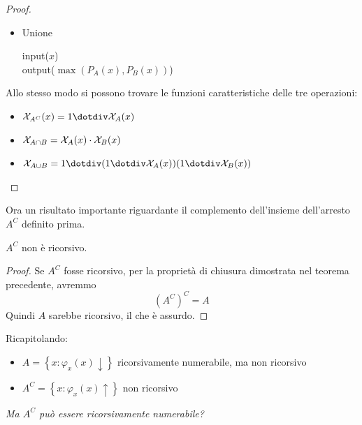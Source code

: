 \begin{proof}
\begin{itemize}
	\item Unione
	\begin{center}
		\begin{minipage}{.5\textwidth}
			\begin{tcolorbox}[
				colback=white,
				sharp corners,
				boxrule=.3mm,
				left=20pt,
				top=0pt,
				bottom=0pt,
				colbacktitle=white,
				coltitle=black
				]
				\begin{algorithm}[H]
					\SetAlgoNoEnd
					input($x$) \\
					output($\max (P_A (x), P_B (x))$)
				\end{algorithm}
			\end{tcolorbox}
		\end{minipage}
	\end{center}
	\end{itemize}

	Allo stesso modo si possono trovare le funzioni caratteristiche delle tre operazioni:
	\begin{itemize}
		\item $\X_{A^C} (x) = 1 \dotminus \X_A (x)$
		\item $\mathcal{X}_{A \cap B} = \mathcal{X}_A (x) \cdot \mathcal{X}_B (x)$
		\item $\X_{A \cup B} = 1 \dotminus (1 \dotminus \X_A (x)) (1 \dotminus \X_B (x))$
	\end{itemize}
\end{proof}

Ora un risultato importante riguardante il complemento dell'insieme dell'arresto $A^C$ definito prima.\\

\begin{theor}
	$A^C$ non è ricorsivo.
\end{theor}
\begin{proof}
	Se $A^C$ fosse ricorsivo, per la proprietà di chiusura dimostrata nel teorema precedente, avremmo
	$$ \left(A^C\right)^C = A $$
	Quindi $A$ sarebbe ricorsivo, il che è assurdo.
\end{proof}

Ricapitolando:
\begin{itemize}
	\item $A = \left\{x: \varphi_x (x) \downarrow\right\}$ ricorsivamente numerabile, ma non ricorsivo
	\item $A^C = \left\{x: \varphi_x (x) \uparrow\right\}$ non ricorsivo
\end{itemize}
\textit{Ma $A^C$ può essere ricorsivamente numerabile?}\\

